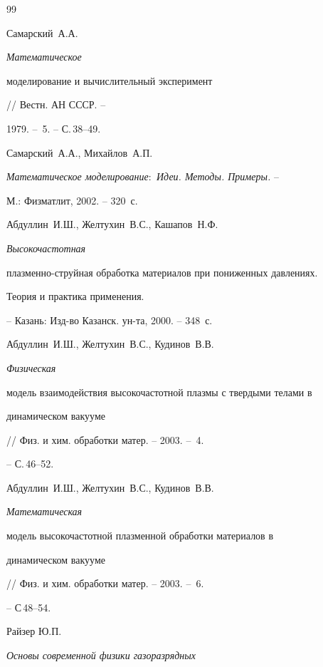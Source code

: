 \begin{thebibliography}{99}





 Самарский~А.А. {\em Математическое


моделирование и вычислительный эксперимент} // Вестн. АН СССР. --


1979. -- \No\,5. -- С.\,38--49.





 Самарский~А.А., Михайлов~А.П.


{\em Математическое моделирование\/${:}$ Идеи. Методы. Примеры.} --


М.: Физматлит, 2002. -- 320~с.







Абдуллин~И.Ш., Желтухин~В.С., Кашапов~Н.Ф. {\em Высокочастотная


плазменно-струйная обработка материалов при пониженных давлениях.


Теория и практика применения.}


-- Казань: Изд-во Казанск. ун-та, 2000. -- 348~с.







Абдуллин~И.Ш., Желтухин~В.С., Кудинов~В.В. {\em Физическая


модель взаимодействия высокочастотной плазмы с твердыми телами в


динамическом вакууме} // Физ. и хим. обработки матер. -- 2003. -- \No\,4.


-- С.\,46--52. 







Абдуллин~И.Ш., Желтухин~В.С., Кудинов~В.В. {\em Математическая


модель высокочастотной плазменной обработки материалов в


динамическом вакууме} // Физ. и хим. обработки матер. -- 2003. -- \No\,6.


-- С\,48--54.







Райзер Ю.П. {\em Основы современной физики газоразрядных


}
\end{thebibliography}
